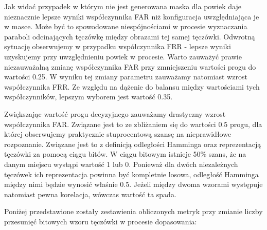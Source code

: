 \documentclass[10pt,polish,a4paper,oneside]{ppfcmthesis}
\begin{document}
Jak wida\'c przypadek w którym nie jest generowana maska dla powiek daje nieznacznie lepsze wyniki
współczynnika FAR niż konfiguracja uwzględniająca je w masce. Może by\'c to spowodowane niespójnościami
w procesie wyznaczania paraboli odcinających tęczówkę między obrazami tej samej tęczówki. Odwrotną sytuację
obserwujemy w przypadku współczynnika FRR - lepsze wyniki uzyskujemy przy uwzględnieniu powiek w procesie.
Warto zauważy\'c prawie niezauważalną zmianę współczynnika FAR przy zmniejszeniu wartości progu do wartości 0.25.
W wyniku tej zmiany parametru zauważamy natomiast wzrost współczynnika FRR. Ze względu na dążenie do balansu
między wartościami tych współczynników, lepszym wyborem jest wartoś\'c 0.35.

Zwiększając wartoś\'c progu decyzyjnego zauważamy drastyczny wzrost współczynnika FAR. Związane jest to ze zbliżaniem
się do wartości 0.5 progu, dla której obserwujemy praktycznie stuprocentową szansę na nieprawidłowe rozpoznanie.
Związane jest to z definicją odległości Hamminga oraz reprezentacją tęczówki za pomocą ciągu bitów. W ciągu bitowym
istnieje 50\% szans, że na danym miejscu wystąpi wartoś\'c 1 lub 0. Ponieważ dla dwóch niezależnych tęczówek
ich reprezentacja powinna by\'c kompletnie losowa, odległoś\'c Hamminga między nimi będzie wynosi\'c właśnie 0.5.
Jeżeli między dwoma wzorami występuje natomiast pewna korelacja, wówczas wartoś\'c ta spada.\newline

\noindent
Poniżej przedstawione zostały zestawienia obliczonych metryk przy zmianie liczby przesunię\'c bitowych
wzoru tęczówki w procesie dopasowania:
\end{document}
